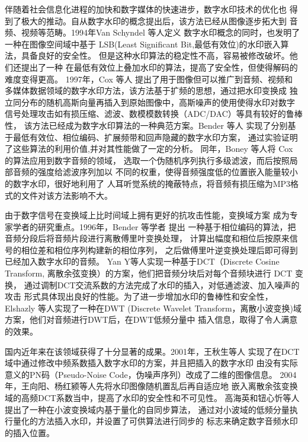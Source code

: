 \documentclass[a4paper]{article}
\begin{document}
伴随着社会信息化进程的加快和数字媒体的快速进步，数字水印技术的优化也
得到了极大的推动。自从数字水印的概念提出后，该方法已经从图像逐步拓大到
音频、视频等范畴。1994年Van Schyndel 等人\cite{schyndel1994}定义
数字水印概念的同时，也发明了一种在图像空间域中基于
LSB(Least Significant Bit,最低有效位)的水印嵌入算法，具备良好的安全性。
但是这种水印算法的稳定性不高，容易被修改破坏。他们还提出了一种
在最低有效位上叠加水印的算法，提高了安全性，但使得解码的难度变得更高。
1997年，Cox 等人\cite{cox1997} 提出了用于图像但可以推广到音频、视频和
多媒体数据领域的数字水印方法，该方法基于扩频的思想，通过把水印变换成
独立同分布的随机高斯向量再插入到原始图像中，高斯噪声的使用使得水印对数字
信号处理攻击如有损压缩、滤波、数模模数转换（ADC/DAC）等具有较好的鲁棒性，
该方法已经成为数字水印算法的一种典范方案。Bender 等人\cite{bender1996}
实现了分别基于最低有效位、相位编码、扩展频带和回声隐藏的数字水印方案，
通过实验证明了这些算法的利用价值,并对其性能做了一定的分析。
同年，Boney 等人\cite{boney1996}将 Cox 的算法应用到数字音频的领域，
选取一个伪随机序列执行多级滤波，而后按照局部音频的强度给滤波序列加以
不同的权重，使得音频强度低的位置嵌入能量较小的数字水印，很好地利用了
人耳听觉系统的掩蔽特点，将音频有损压缩为MP3格式的文件对该方法影响不大。

由于数字信号在变换域上比时间域上拥有更好的抗攻击性能，变换域方案
成为专家学者的研究重点。1996年，Bender 等学者\cite{bender1996} 提出
一种基于相位编码的算法，把音频分段后将音频片段进行离散傅里叶变换处理，
计算出幅度和相位后按原来信号的相位差和相位序列构建新的相位序列，
之后做傅里叶逆变换处理后即可得到已经加入数字水印的音频。
Yan Y等人\cite{yang2009}实现一种基于DCT（Discrete Cosine Transform,
离散余弦变换）的方案，他们把音频分块后对每个音频块进行 DCT 变换，
通过调制DCT交流系数的方法完成了水印的插入，对低通滤波、加入噪声的攻击
形式具体现出良好的性能。为了进一步增加水印的鲁棒性和安全性，
Elshazly 等人\cite{elshazly2012}实现了一种在DWT (Discrete Wavelet
Transform，离散小波变换)域方案，他们对音频进行DWT后，在DWT低频分量中
插入信息，取得了令人满意的效果。

国内近年来在该领域获得了十分显著的成果。2001年，王秋生等人\cite{wang2001}
实现了在DCT域中通过修改中频系数插入数字水印的方案，并且把插入的数字水印
由没有实际意义的PN码（Pseudo-Noise Code，伪噪声序列）改成了二维的图像信息。
2004年，王向阳、杨红颍等人\cite{wang2004}先将水印图像随机置乱后再自适应地
嵌入离散余弦变换域的高频DCT系数当中，提高了水印的安全性和不可见性。
高海英和钮心忻等人\cite{gao2005}提出了一种在小波变换域内基于量化的自同步算法，
通过对小波域的低频分量执行量化的方法插入水印，并设置了可供算法进行同步的
标志来确定数字音频水印的插入位置。



\end{document}
